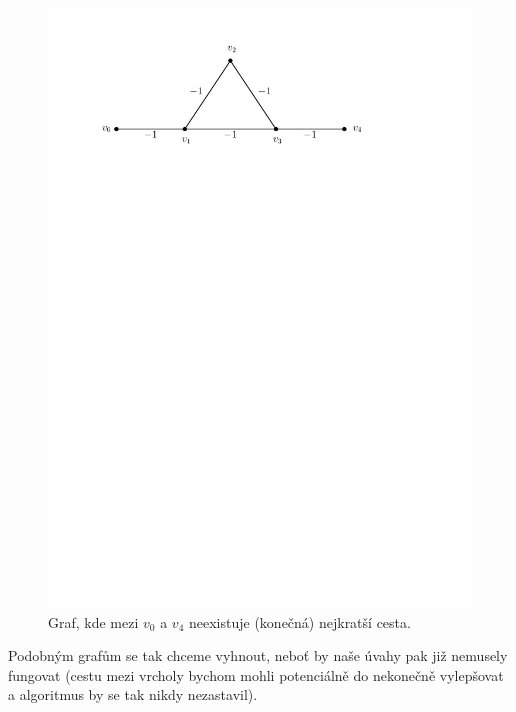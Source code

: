 \begin{figure}[h]
    \centering
    \includegraphics[scale=\graphimgsize]{01-grafalgo/images/ch01_zapor_ohod_graf.pdf}
    \caption{Graf, kde mezi $v_0$ a $v_4$ neexistuje (konečná) nejkratší cesta.}
    \label{fig:zapor_ohod_graf}
\end{figure}
Podobným grafům se tak chceme vyhnout, neboť by naše úvahy pak již nemusely fungovat (cestu mezi vrcholy bychom mohli potenciálně do nekonečně vylepšovat a algoritmus by se tak nikdy nezastavil).

